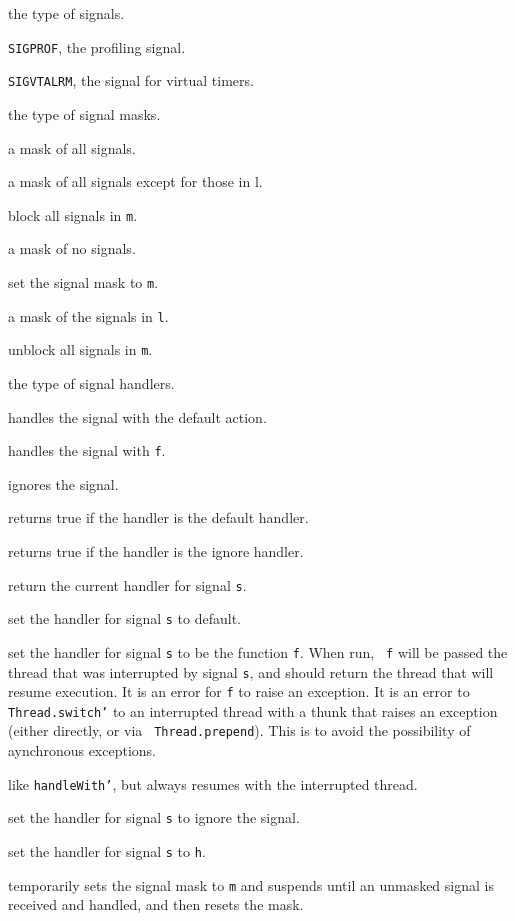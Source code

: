 \begin{description}

 the type of signals.

{\tt SIGPROF}, the profiling signal.

{\tt SIGVTALRM}, the signal for virtual timers.

 the type of signal masks.

 a mask of all signals.

 a mask of all signals except for those in l.

 block all signals in {\tt m}.

 a mask of no signals.

 set the signal mask to {\tt m}.

 a mask of the signals in {\tt l}.

 unblock all signals in {\tt m}.

 the type of signal handlers.

 handles the signal with the default action.

 handles the signal with {\tt f}.

 ignores the signal.

 returns true if the handler is the default handler.

 returns true if the handler is the ignore handler.

 return the current handler for signal {\tt s}.

 set the handler for signal {\tt s} to default.

set the handler for signal {\tt s} to be the function {\tt f}.  When run, {\tt
f} will be passed the thread that was interrupted by signal {\tt s}, and should
return the thread that will resume execution.  It is an error for {\tt f} to
raise an exception.  It is an error to {\tt Thread.switch'} to an interrupted
thread with a thunk that raises an exception (either directly, or via {\tt
Thread.prepend}).  This is to avoid the possibility of aynchronous exceptions.

 like {\tt handleWith'}, but always resumes with the
interrupted thread.

 set the handler for signal {\tt s} to ignore the signal.

 set the handler for signal {\tt s} to {\tt h}.

temporarily sets the signal mask to {\tt m} and suspends until an
unmasked signal is received and handled, and then resets the mask.
\end{description}

